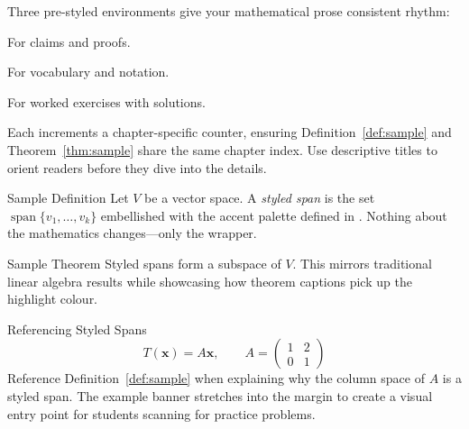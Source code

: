 \label{ch:structured-content}

\label{sec:choose-box}


Three pre-styled environments give your mathematical prose consistent rhythm:
\begin{description}[leftmargin=1.8em,labelwidth=2.8em]
  \item[\texttt{theoremBox}] For claims and proofs.
  \item[\texttt{definitionBox}] For vocabulary and notation.
  \item[\texttt{textexample}] For worked exercises with solutions.
\end{description}

Each increments a chapter-specific counter, ensuring Definition~\ref{def:sample}
and Theorem~\ref{thm:sample} share the same chapter index. Use descriptive titles
to orient readers before they dive into the details.

\label{sec:demo-boxes}

\begin{definitionBox}{Sample Definition}
\label{def:sample}
Let \(V\) be a vector space. A \emph{styled span} is the set
\(\operatorname{span}\{v_1,\dots,v_k\}\) embellished with the accent palette defined in
. Nothing about the mathematics changes—only the wrapper.
\end{definitionBox}

\begin{theoremBox}{Sample Theorem}
\label{thm:sample}
Styled spans form a subspace of \(V\). This mirrors traditional linear algebra
results while showcasing how theorem captions pick up the highlight colour.
\end{theoremBox}

\begin{textexample}{Referencing Styled Spans}
\label{ex:styled-span}
\[
  T(\mathbf{x}) = A\mathbf{x},\qquad A =
  \begin{pmatrix}
    1 & 2 \\
    0 & 1
  \end{pmatrix}
\]
\solutiontag\; Reference Definition~\ref{def:sample} when explaining why the column
space of \(A\) is a styled span. The example banner stretches into the margin to
create a visual entry point for students scanning for practice problems.
\end{textexample}

